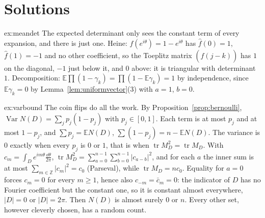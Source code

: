 \section{Solutions}

\begin{solution}{ex:meandet}
\idea The expected determinant only sees the constant term of every expansion, and there is just one.
\writeup Heine: $f(e^{i\theta})=1-e^{i\theta}$ has $\hat f(0)=1$, $\hat f(1)=-1$ and no other coefficient, so the Toeplitz matrix $(\hat f(j-k))$ has $1$ on the diagonal, $-1$ just below it, and $0$ above: it is triangular with determinant
$1$. Decomposition: $\mathbb E\prod(1-\gamma_k)=\prod(1-\mathbb E\gamma_k)=1$ by independence, since $\mathbb E\gamma_k=0$ by Lemma~\ref{lem:uniformvector}(3) with $a=1$, $b=0$.
\end{solution}

\begin{solution}{ex:varbound}
\idea The coin flips do all the work.
\writeup By Proposition~\ref{prop:bernoulli}, $\operatorname{Var}N(D)=\sum_jp_j(1-p_j)$ with $p_j\in[0,1]$. Each term is at most $p_j$ and at most $1-p_j$, and $\sum p_j=\mathbb EN(D)$, $\sum(1-p_j)=n-\mathbb EN(D)$. The variance is $0$ exactly when
every $p_j$ is $0$ or $1$, that is when $\operatorname{tr}M_D^2=\operatorname{tr}M_D$. With $c_m=\int_De^{im\theta}\frac{\dd\theta}{2\pi}$, $\operatorname{tr}M_D^2=\sum_{a=0}^{n-1}\sum_{b=0}^{n-1}|c_{a-b}|^2$, and for each $a$ the inner sum is at most $\sum_{m\in\mathbb Z}|c_m|^2=c_0$ (Parseval), while
$\operatorname{tr}M_D=nc_0$. Equality for $a=0$ forces $c_m=0$ for every $m\ge1$, hence also $c_{-m}=\bar c_m=0$: the indicator of $D$ has no Fourier coefficient but the constant one, so it is constant almost everywhere, $|D|=0$ or $|D|=2\pi$. Then $N(D)$ is almost surely $0$ or $n$. Every other set, however cleverly chosen, has a random count.
\end{solution}

